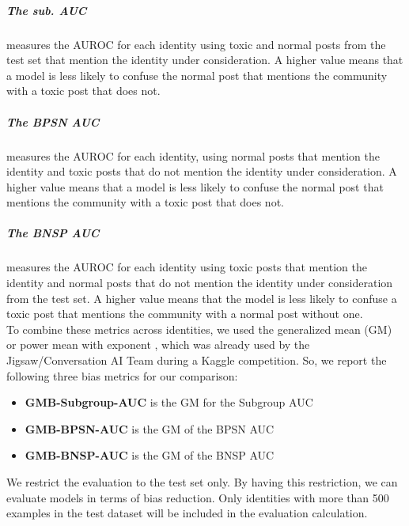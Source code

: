 \documentclass[a4paper,english]{rnti}
\makeatletter
\newcommand\foottotoref[1]{\protected@xdef\@thefnmark{\ref{#1}}\@footnotemark}
\makeatother
\begin{document}
 \subparagraph{The sub. AUC} measures the AUROC for each identity using toxic and normal posts from the test set that mention the identity under consideration. A higher value means that a model is less likely to confuse the normal post that mentions the community with a toxic post that does not. 
 
 \subparagraph{The BPSN AUC} measures the AUROC for each identity, using normal posts that mention the identity and toxic posts that do not mention the identity under consideration. A higher value means that a model is less likely to confuse the normal post that mentions the community with a toxic post that does not. 
 
 \subparagraph{The BNSP AUC} measures the AUROC for each identity using toxic posts that mention the identity and normal posts that do not mention the identity under consideration from the test set. A higher value means that the model is less likely to confuse a toxic post that mentions the community with a normal post without one.\\
 
To combine these metrics across identities, we used the generalized mean (GM) or power mean with exponent , which was already used by the Jigsaw/Conversation AI Team during a Kaggle competition\foottotoref{civil-comments-data}. So, we report the following three bias metrics for our comparison:

\begin{itemize}
    \item \textbf{GMB-Subgroup-AUC} is the GM for the Subgroup AUC 
    \item \textbf{GMB-BPSN-AUC} is the GM of the  BPSN AUC 
    \item \textbf{GMB-BNSP-AUC} is the GM of the  BNSP AUC
\end{itemize}

We restrict the evaluation to the test set only. By having this restriction, we can evaluate models in terms of bias reduction. Only identities with more than 500 examples in the test dataset will be included in the evaluation calculation.
\end{document}
